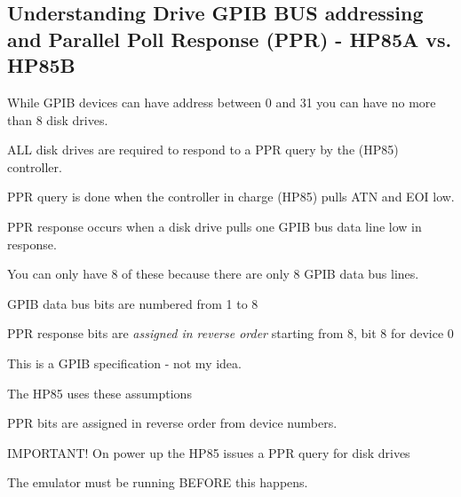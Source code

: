 \begin{DoxyItemize}
\begin{DoxyItemize}
\begin{DoxyItemize}
\begin{DoxyItemize}
 \subsection*{Understanding Drive G\+P\+IB B\+US addressing and Parallel Poll Response (P\+PR) -\/ H\+P85A vs. H\+P85B}
\end{DoxyItemize}
\end{DoxyItemize}
\end{DoxyItemize}
\end{DoxyItemize}

While G\+P\+IB devices can have address between 0 and 31 you can have no more than 8 disk drives.
\begin{DoxyItemize}
\item A\+LL disk drives are required to respond to a P\+PR query by the (H\+P85) controller.
\begin{DoxyItemize}
\item P\+PR query is done when the controller in charge (H\+P85) pulls A\+TN and E\+OI low.
\item P\+PR response occurs when a disk drive pulls one G\+P\+IB bus data line low in response.
\begin{DoxyItemize}
\item You can only have 8 of these because there are only 8 G\+P\+IB data bus lines.
\begin{DoxyItemize}
\item G\+P\+IB data bus bits are numbered from 1 to 8
\item P\+PR response bits are {\itshape assigned in reverse order} starting from 8, bit 8 for device 0
\begin{DoxyItemize}
\item This is a G\+P\+IB specification -\/ not my idea.
\end{DoxyItemize}
\item The H\+P85 uses these assumptions
\begin{DoxyItemize}
\item P\+PR bits are assigned in reverse order from device numbers.
\end{DoxyItemize}
\end{DoxyItemize}
\end{DoxyItemize}
\end{DoxyItemize}
\item I\+M\+P\+O\+R\+T\+A\+N\+T! On power up the H\+P85 issues a P\+PR query for disk drives
\begin{DoxyItemize}
\item The emulator must be running B\+E\+F\+O\+RE this happens.

\end{DoxyItemize}
\end{DoxyItemize}
